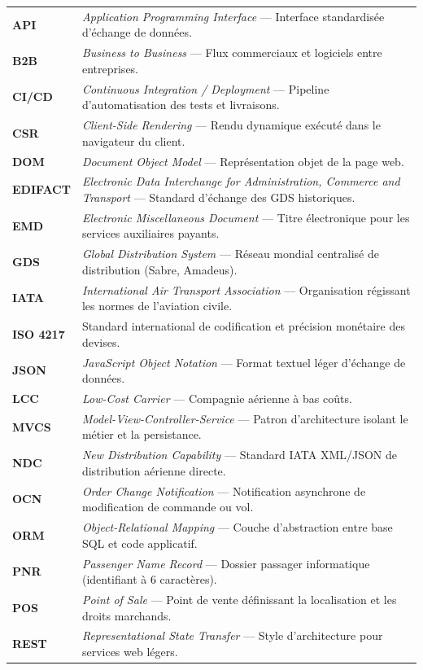 {\begin{longtable}{>{\columncolor{CobaltBlue!5}\bfseries\color{NavyBlue}}p{2.6cm} p{12.2cm}}
API & \textit{Application Programming Interface} — Interface standardisée d'échange de données. \\
B2B & \textit{Business to Business} — Flux commerciaux et logiciels entre entreprises. \\
CI/CD & \textit{Continuous Integration / Deployment} — Pipeline d'automatisation des tests et livraisons. \\
CSR & \textit{Client-Side Rendering} — Rendu dynamique exécuté dans le navigateur du client. \\
DOM & \textit{Document Object Model} — Représentation objet de la page web. \\
EDIFACT & \textit{Electronic Data Interchange for Administration, Commerce and Transport} — Standard d'échange des GDS historiques. \\
EMD & \textit{Electronic Miscellaneous Document} — Titre électronique pour les services auxiliaires payants. \\
GDS & \textit{Global Distribution System} — Réseau mondial centralisé de distribution (Sabre, Amadeus). \\
IATA & \textit{International Air Transport Association} — Organisation régissant les normes de l'aviation civile. \\
ISO 4217 & Standard international de codification et précision monétaire des devises. \\
JSON & \textit{JavaScript Object Notation} — Format textuel léger d'échange de données. \\
LCC & \textit{Low-Cost Carrier} — Compagnie aérienne à bas coûts. \\
MVCS & \textit{Model-View-Controller-Service} — Patron d'architecture isolant le métier et la persistance. \\
NDC & \textit{New Distribution Capability} — Standard IATA XML/JSON de distribution aérienne directe. \\
OCN & \textit{Order Change Notification} — Notification asynchrone de modification de commande ou vol. \\
ORM & \textit{Object-Relational Mapping} — Couche d'abstraction entre base SQL et code applicatif. \\
PNR & \textit{Passenger Name Record} — Dossier passager informatique (identifiant à 6 caractères). \\
POS & \textit{Point of Sale} — Point de vente définissant la localisation et les droits marchands. \\
REST & \textit{Representational State Transfer} — Style d'architecture pour services web légers. \\

\end{longtable}}
